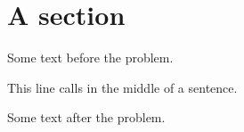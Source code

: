 \section{A section}

Some text before the problem.

This line calls \undefinedmacro in the middle of a sentence.

Some text after the problem.
